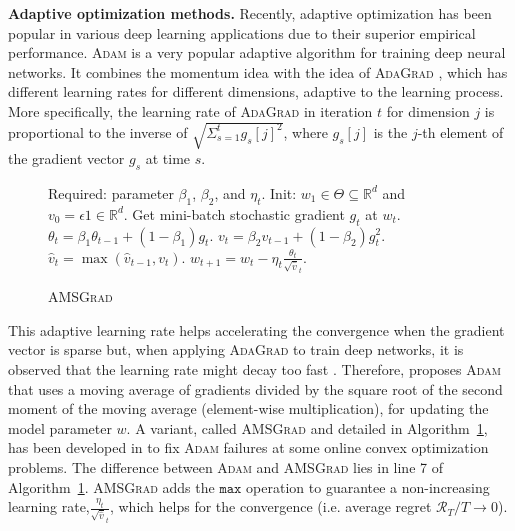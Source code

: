 \documentclass[11pt]{article}
\theoremstyle{k}
\begin{document}
\textbf{Adaptive optimization methods.}\hspace{0.1cm}
Recently, adaptive optimization has been popular in various deep learning applications due to their superior empirical performance. \textsc{Adam} \citep{KB15} is a very popular adaptive algorithm for training deep neural networks.
It combines the momentum idea \citep{P64} with the idea of \textsc{AdaGrad} \citep{DHS11},
which has different learning rates for different dimensions, adaptive to the learning process. More specifically, the learning rate of \textsc{AdaGrad} in iteration $t$ for dimension $j$ is proportional to the inverse of $\sqrt{ \Sigma_{s=1}^t g_s[j]^2 }$, where $g_s[j]$ is the $j$-th element of the gradient vector $g_s$ at time $s$.
\begin{figure}\vspace{-0.7cm}
\begin{minipage}{\linewidth}
\begin{algorithm}[H]
\caption{\textsc{AMSGrad} \citep{RKK18}} \label{alg:amsgrad}
\begin{algorithmic}[1]
\small
\STATE Required: parameter $\beta_1$, $\beta_2$, and $\eta_t$. 
\STATE Init: $w_{1} \in \Theta \subseteq \mathbb R^d $ and $v_{0} = \epsilon 1 \in \mathbb R^{d}$.
\STATE Get mini-batch stochastic gradient $g_t$ at $w_t$.
\STATE $\theta_t = \beta_1 \theta_{t-1} + (1 - \beta_1) g_t$.
\STATE $v_t = \beta_2 v_{t-1} + (1 - \beta_2) g_t^2$. 
\STATE $\hat{v}_t = \max( \hat{v}_{t-1} , v_t )$. 
\STATE $w_{t+1} = w_t - \eta_t \frac{\theta_t}{ \sqrt{\hat{v}}_t }$.
\ENDFOR
\end{algorithmic}
\end{algorithm}\vspace{.1cm}
\end{minipage}\end{figure}
This adaptive learning rate helps accelerating the convergence when the gradient vector is sparse \citep{DHS11} but, when applying \textsc{AdaGrad} to train deep networks, it is observed that the learning rate might decay too fast \citep{KB15}.
Therefore, \citep{KB15} proposes \textsc{Adam} that uses a moving average of gradients divided by the square root of the second moment of the moving average (element-wise multiplication), for updating the model parameter $w$.
A variant, called \textsc{AMSGrad} and detailed in Algorithm~\ref{alg:amsgrad}, has been developed in \citep{RKK18} to fix \textsc{Adam} failures at some online convex optimization problems.
The difference between \textsc{Adam} and \textsc{AMSGrad} lies in line 7 of Algorithm~\ref{alg:amsgrad}.
\textsc{AMSGrad} \citep{RKK18} adds the $\texttt{max}$ operation to guarantee a non-increasing learning rate,$\frac{\eta_t }{ \sqrt{\hat{v}}_t }$, which helps for the convergence (i.e. average regret $\mathcal{R}_T/T \rightarrow 0$).
\vspace{-0.1in}
\end{document}
